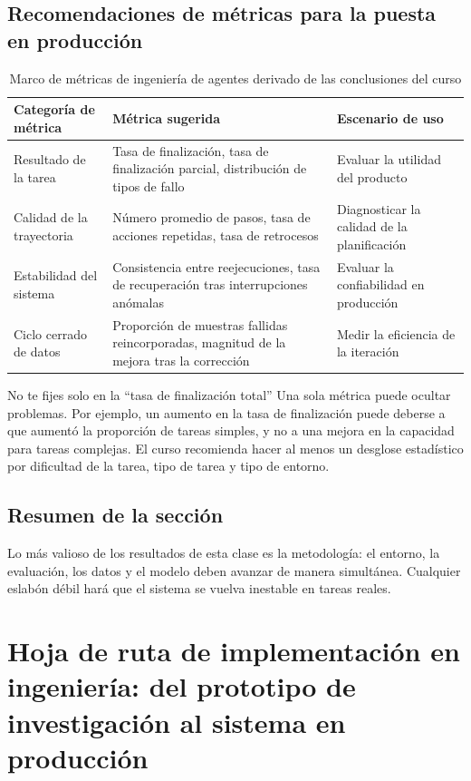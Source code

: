 \documentclass[a4paper]{article}
\begin{document}
\subsection{Recomendaciones de métricas para la puesta en producción}
\begin{table}[H]
\centering
\begin{tabular}{p{3.2cm}p{5.0cm}p{2.8cm}}
\toprule
\textbf{Categoría de métrica} & \textbf{Métrica sugerida} & \textbf{Escenario de uso} \\
\midrule
Resultado de la tarea & Tasa de finalización, tasa de finalización parcial, distribución de tipos de fallo & Evaluar la utilidad del producto \\
Calidad de la trayectoria & Número promedio de pasos, tasa de acciones repetidas, tasa de retrocesos & Diagnosticar la calidad de la planificación \\
Estabilidad del sistema & Consistencia entre reejecuciones, tasa de recuperación tras interrupciones anómalas & Evaluar la confiabilidad en producción \\
Ciclo cerrado de datos & Proporción de muestras fallidas reincorporadas, magnitud de la mejora tras la corrección & Medir la eficiencia de la iteración \\
\bottomrule
\end{tabular}
\caption{Marco de métricas de ingeniería de agentes derivado de las conclusiones del curso}
\end{table}

\begin{warningbox}{No te fijes solo en la ``tasa de finalización total''}
Una sola métrica puede ocultar problemas. Por ejemplo, un aumento en la tasa de finalización puede deberse a que aumentó la proporción de tareas simples, y no a una mejora en la capacidad para tareas complejas. El curso recomienda hacer al menos un desglose estadístico por dificultad de la tarea, tipo de tarea y tipo de entorno.
\end{warningbox}

\subsection{Resumen de la sección}
Lo más valioso de los resultados de esta clase es la metodología: el entorno, la evaluación, los datos y el modelo deben avanzar de manera simultánea. Cualquier eslabón débil hará que el sistema se vuelva inestable en tareas reales.
\section{Hoja de ruta de implementación en ingeniería: del prototipo de investigación al sistema en producción}
\end{document}
